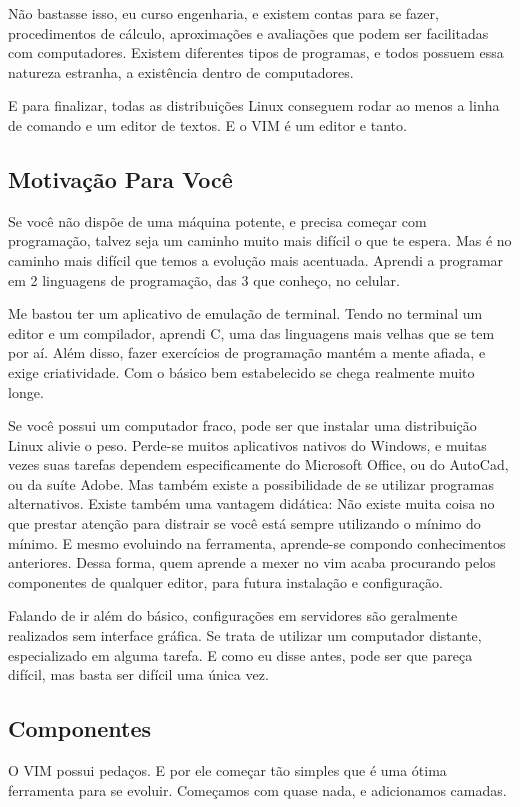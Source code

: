 \documentclass[a4paper, 12pt]{article}
\begin{document}
Não bastasse isso, eu curso engenharia, e existem contas para se fazer, procedimentos de cálculo, aproximações e avaliações que podem ser facilitadas com computadores.
Existem diferentes tipos de programas, e todos possuem essa natureza estranha, a existência dentro de computadores.

E para finalizar, todas as distribuições Linux conseguem rodar ao menos a linha de comando e um editor de textos.
E o VIM é um editor e tanto.

\subsection{Motivação Para Você}
Se você não dispõe de uma máquina potente, e precisa começar com programação, talvez seja um caminho muito mais difícil o que te espera.
Mas é no caminho mais difícil que temos a evolução mais acentuada.
Aprendi a programar em 2 linguagens de programação, das 3 que conheço, no celular.

Me bastou ter um aplicativo de emulação de terminal.
Tendo no terminal um editor e um compilador, aprendi C, uma das linguagens mais velhas que se tem por aí.
Além disso, fazer exercícios de programação mantém a mente afiada, e exige criatividade.
Com o básico bem estabelecido se chega realmente muito longe.

Se você possui um computador fraco, pode ser que instalar uma distribuição Linux alivie o peso.
Perde-se muitos aplicativos nativos do Windows, e muitas vezes suas tarefas dependem especificamente do Microsoft Office, ou do AutoCad, ou da suíte Adobe.
Mas também existe a possibilidade de se utilizar programas alternativos.
Existe também uma vantagem didática:
Não existe muita coisa no que prestar atenção para distrair se você está sempre utilizando o mínimo do mínimo.
E mesmo evoluindo na ferramenta, aprende-se compondo conhecimentos anteriores. 
Dessa forma, quem aprende a mexer no vim acaba procurando pelos componentes de qualquer editor, para futura instalação e configuração.

Falando de ir além do básico, configurações em servidores são geralmente realizados sem interface gráfica.
Se trata de utilizar um computador distante, especializado em alguma tarefa.
E como eu disse antes, pode ser que pareça difícil, mas basta ser difícil uma única vez.

\subsection{Componentes}
O VIM possui pedaços.
E por ele começar tão simples que é uma ótima ferramenta para se evoluir.
Começamos com quase nada, e adicionamos camadas.
\end{document}
